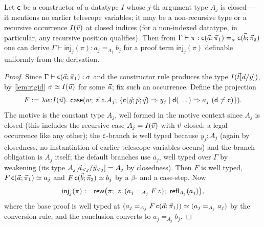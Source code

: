 \begin{lemma}
\label{lem:inj-derivable}
Let $\mathsf{c}$ be a constructor of a datatype $I$ whose $j$-th argument
type $A_j$ is closed --- it mentions no earlier telescope variables; it
may be a non-recursive type or a recursive occurrence $I(\vec{v})$ at
closed indices (for a non-indexed datatype, in particular, any
recursive position qualifies).  Then from $\Gamma \vdash \pi :
\mathsf{c}(\vec{a};\vec{\pi}_1) =_\sigma \mathsf{c}(\vec{b};\vec{\pi}_2)$
one can derive $\Gamma \vdash \mathsf{inj}_j(\pi) : a_j =_{A_j} b_j$
for a proof term $\mathsf{inj}_j(\pi)$ definable uniformly from the
derivation.
\end{lemma}

\begin{proof}
Since $\Gamma \vdash \mathsf{c}(\vec{a};\vec{\pi}_1) : \sigma$ and the
constructor rule produces the type $I(\vec{t}[\vec{a}/\vec{y}])$, by
\cref{lem:rigid} $\sigma \simeq I(\vec{u})$ for some $\vec{u}$; fix such
an occurrence.  Define the projection
\[
  F \mathrel{:=} \lambda w{:}I(\vec{u}).\ \mathsf{case}(w;\,\vec{z}.z.A_j;\,\{\mathsf{c}(\vec{y};\vec{p};\vec{q}) \Rightarrow y_j \mid
      \mathsf{d}(\dots) \Rightarrow a_j \ (\mathsf{d} \neq \mathsf{c})\}).
\]
The motive is the constant type $A_j$, well formed in the motive
context since $A_j$ is closed (this includes the recursive case $A_j =
I(\vec{v})$ with $\vec{v}$ closed: a legal occurrence like any other);
the $\mathsf{c}$-branch is well typed because $y_j : A_j$ (again by
closedness, no instantiation of earlier telescope variables occurs) and
the branch obligation is $A_j$ itself; the default branches use $a_j$,
well typed over $\Gamma$ by weakening (its type
$A_j[\vec{a}_{<j}/\vec{y}_{<j}] = A_j$ by closedness).  Then $F$ is
well typed, $F\,\mathsf{c}(\vec{a};\vec{\pi}_1) \simeq a_j$ and
$F\,\mathsf{c}(\vec{b};\vec{\pi}_2) \simeq b_j$ by a $\beta$- and a
case-step.  Now
\[
  \mathsf{inj}_j(\pi) \mathrel{:=}
  \mathsf{rew}\bigl(\pi;\ z.\,(a_j =_{A_j} F\,z);\
    \mathsf{refl}_{A_j}(a_j)\bigr),
\]
where the base proof is well typed at $(a_j =_{A_j}
F\,\mathsf{c}(\vec{a};\vec{\pi}_1)) \simeq (a_j =_{A_j} a_j)$ by the
conversion rule, and the conclusion converts to $a_j =_{A_j} b_j$.
\end{proof}

